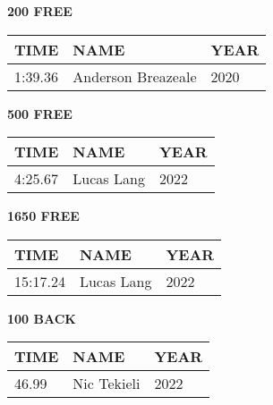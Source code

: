 \begin{table}[H]
\centering
\begin{minipage}[t]{0.48\textwidth}
\centering
\textbf{200 FREE}\\[0.1cm]
\begin{tabular}{@{}p{1.8cm}p{2.8cm}p{1.2cm}@{}}
\hline
    \textbf{TIME} & \textbf{NAME} & \textbf{YEAR} \\
\hline
    1:39.36 & Anderson Breazeale & 2020 \\
\hline
\end{tabular}
\end{minipage}\hfill
\begin{minipage}[t]{0.48\textwidth}
\centering
\textbf{500 FREE}\\[0.1cm]
\begin{tabular}{@{}p{1.8cm}p{2.8cm}p{1.2cm}@{}}
\hline
    \textbf{TIME} & \textbf{NAME} & \textbf{YEAR} \\
\hline
    4:25.67 & Lucas Lang & 2022 \\
\hline
\end{tabular}
\end{minipage}
\end{table}

\begin{table}[H]
\centering
\begin{minipage}[t]{0.48\textwidth}
\centering
\textbf{1650 FREE}\\[0.1cm]
\begin{tabular}{@{}p{1.8cm}p{2.8cm}p{1.2cm}@{}}
\hline
    \textbf{TIME} & \textbf{NAME} & \textbf{YEAR} \\
\hline
    15:17.24 & Lucas Lang & 2022 \\
\hline
\end{tabular}
\end{minipage}\hfill
\begin{minipage}[t]{0.48\textwidth}
\centering
\textbf{100 BACK}\\[0.1cm]
\begin{tabular}{@{}p{1.8cm}p{2.8cm}p{1.2cm}@{}}
\hline
    \textbf{TIME} & \textbf{NAME} & \textbf{YEAR} \\
\hline
    46.99 & Nic Tekieli & 2022 \\
\hline
\end{tabular}
\end{minipage}
\end{table}

